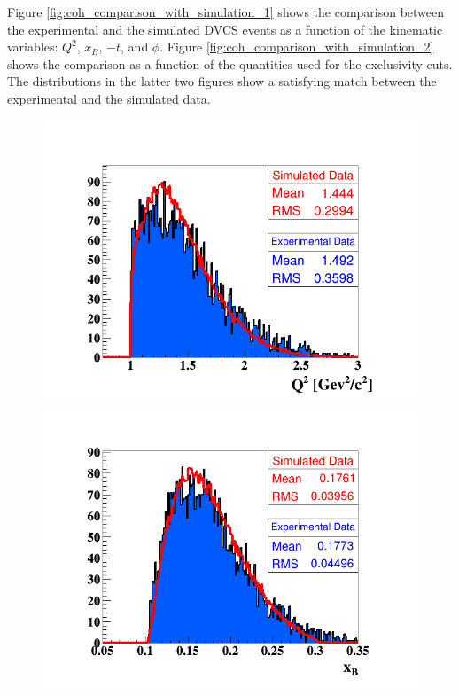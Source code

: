 Figure \ref{fig:coh_comparison_with_simulation_1} shows the comparison between 
the experimental and the simulated DVCS events as a function of the kinematic 
variables: $Q^{2}$, $x_{B}$, $-t$, and $\phi$. Figure 
\ref{fig:coh_comparison_with_simulation_2} shows the comparison as a function 
of the quantities used for the exclusivity cuts. The distributions in the 
latter two figures show a satisfying match between the experimental and the 
simulated data.
\begin{figure}[h!]
\includegraphics[scale=0.31]{fig_dvcs/comp/Q2_Coh.png}
\includegraphics[scale=0.31]{fig_dvcs/comp/xB_Coh.png}

\end{figure}
